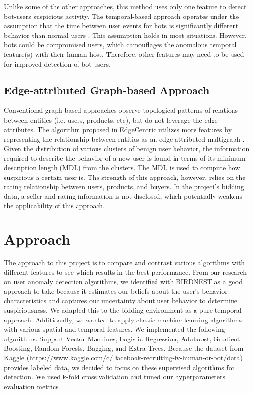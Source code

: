 \documentclass{article} %
\begin{document}
Unlike some of the other approaches, this method uses only one feature to detect bot-users suspicious activity.
The temporal-based approach operates under the assumption that the time between user events for bots is significantly different behavior than normal users \cite{birdnest} \cite{rsc} \cite{sfp} \cite{cicp}.
This assumption holds in most situations.
However, bots could be compromised users, which camouflages the anomalous temporal feature(s) with their human host.
Therefore, other features may need to be used for improved detection of bot-users.

\subsection{Edge-attributed Graph-based Approach}

Conventional graph-based approaches observe topological patterns of relations between entities (i.e. users, products, etc), but do not leverage the edge-attributes.
The algorithm proposed in EdgeCentric utilizes more features by representing the relationship between entities as an edge-attributed multigraph \cite{edgecentric}.
Given the distribution of various clusters of benign user behavior, the information required to describe the behavior of a new user is found in terms of its minimum description length (MDL) from the clusters.
The MDL is used to compute how suspicious a certain user is.
The strength of this approach, however, relies on the rating relationship between users, products, and buyers.
In the project's bidding data, a seller and rating information is not disclosed, which potentially weakens the applicability of this approach.

\section{Approach}

The approach to this project is to compare and contrast various algorithms with different features to see which results in the best performance. From our research on user anomaly detection algorithms, we identified with BIRDNEST as a good approach to take because it estimates our beliefs about the user's behavior characteristics and captures our uncertainty about user behavior to determine suspiciousness. We adapted this to the bidding environment as a pure temporal approach. Additionally, we wanted to apply classic machine learning algorithms with various spatial and temporal features. We implemented the following algorithms: Support Vector Machines, Logistic Regression, Adaboost, Gradient Boosting, Random Forests, Bagging, and Extra Trees. 
Because the dataset from Kaggle (\url{https://www.kaggle.com/c/ facebook-recruiting-iv-human-or-bot/data}) provides labeled data, we decided to focus on these supervised algorithms for detection.
We used k-fold cross validation and tuned our hyperparameters evaluation metrics. 
\end{document}
